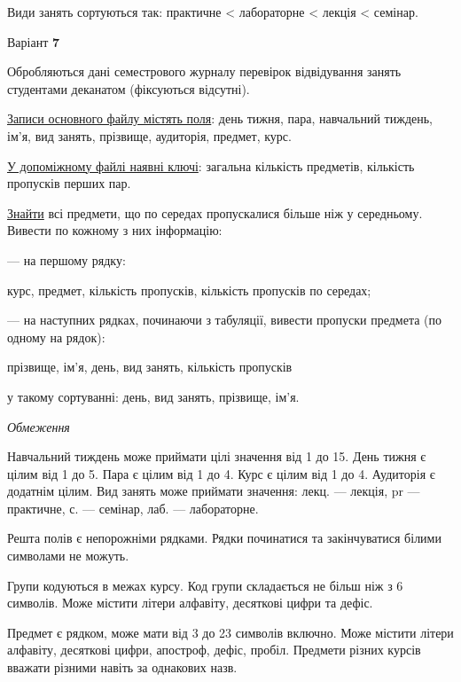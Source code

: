 \documentclass[11pt, ukrainian]{article}
\begin{document}
Види занять сортуються так: практичне < лабораторне < лекція < семінар.



\par
\newpage
{\center Варіант  \No \textbf { 7 }\par}
\bigskip
Обробляються дані семестрового журналу перевірок відвідування занять студентами деканатом (фіксуються відсутні). 

\underline{Записи основного файлу містять поля}: день тижня, пара, навчальний тиждень, ім’я, вид занять, прізвище, аудиторія, предмет, курс.

\underline{У допоміжному файлі наявні ключі}: загальна кількість предметів, кількість пропусків перших пар.

\underline{Знайти} всі предмети, що по середах пропускалися більше ніж у середньому. Вивести по кожному з них інформацію:\par
{\noindent}--- на першому рядку:\par
курс, предмет, кількість пропусків, кількість пропусків по середах;

{\noindent}--- на наступних рядках, починаючи з табуляції, вивести пропуски предмета (по одному на рядок):\par
прізвище, ім’я, день, вид занять, кількість пропусків

{\noindent}у такому сортуванні: день, вид занять, прізвище, ім’я.


\bigskip\textit{Обмеження}

Навчальний тиждень може приймати цілі значення від 1 до 15.
День тижня є цілим від 1 до 5. Пара є цілим від 1 до 4.
Курс є цілим від 1 до 4. Аудиторія є додатнім цілим.
Вид занять може приймати значення:
лекц. --- лекція, pr --- практичне, с. --- семінар, лаб. --- лабораторне.

Решта полів є непорожніми рядками.
Рядки починатися та закінчуватися білими символами не можуть.

Групи кодуються в межах курсу.
Код групи складається не більш ніж з 6 символів.
Може містити літери алфавіту, десяткові цифри та дефіс.

Предмет є рядком, може мати від 3 до 23 символів включно.
Може містити літери алфавіту, десяткові цифри, апостроф, дефіс, пробіл.
Предмети різних курсів вважати різними навіть за однакових назв.
\end{document}
